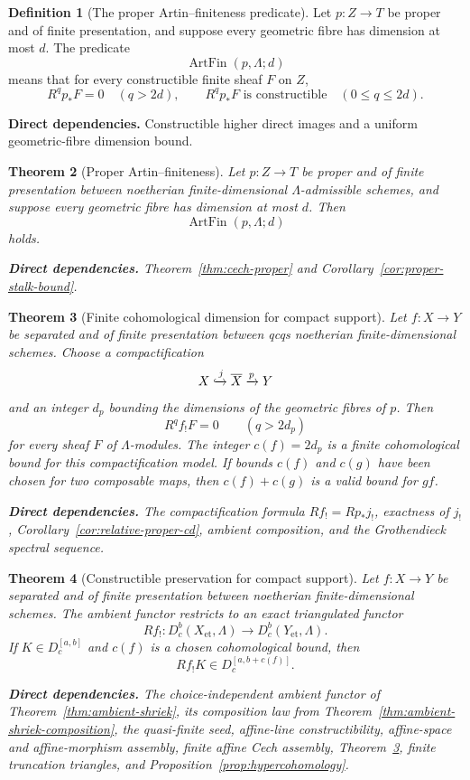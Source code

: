 \documentclass[10pt]{article}
\newtheorem{theorem}{Theorem}[section]
\theoremstyle{definition}
\newtheorem{definition}[theorem]{Definition}
\newcommand{\Dbc}{D^b_c}
\newcommand{\deps}[1]{\par\smallskip\noindent\textbf{Direct dependencies.} #1}
\begin{document}
\begin{definition}[The proper Artin--finiteness predicate]
Let $p:Z\to T$ be proper and of finite presentation, and suppose every
geometric fibre has dimension at most $d$.  The predicate
\[
 \operatorname{ArtFin}(p,\Lambda;d)
\]
means that for every constructible finite sheaf $F$ on $Z$,
\[
 R^qp_*F=0\quad(q>2d),
 \qquad
 R^qp_*F\text{ is constructible}\quad(0\leq q\leq2d).
\]
\deps{Constructible higher direct images and a uniform geometric-fibre
dimension bound.}
\end{definition}

\begin{theorem}[Proper Artin--finiteness]
\label{thm:artfin}
Let $p:Z\to T$ be proper and of finite presentation between noetherian
finite-dimensional $\Lambda$-admissible schemes, and suppose every geometric
fibre has dimension at most $d$.  Then
\[
 \operatorname{ArtFin}(p,\Lambda;d)
\]
holds.
\deps{Theorem~\ref{thm:cech-proper} and
Corollary~\ref{cor:proper-stalk-bound}.}
\end{theorem}

\begin{theorem}[Finite cohomological dimension for compact support]
\label{thm:finite-cd-shriek}
Let $f:X\to Y$ be separated and of finite presentation between qcqs
noetherian finite-dimensional schemes.  Choose a compactification
\[
 X\xhookrightarrow{j}\overline X\xrightarrow{p}Y
\]
and an integer $d_p$ bounding the dimensions of the geometric fibres of
$p$.  Then
\[
 R^qf_!F=0\qquad(q>2d_p)
\]
for every sheaf $F$ of $\Lambda$-modules.  The integer $c(f)=2d_p$ is a finite
cohomological bound for this compactification model.  If bounds $c(f)$ and
$c(g)$ have been chosen for two composable maps, then $c(f)+c(g)$ is a valid
bound for $gf$.
\deps{The compactification formula $Rf_!=Rp_*j_!$, exactness of $j_!$,
Corollary~\ref{cor:relative-proper-cd}, ambient composition, and the
Grothendieck spectral sequence.}
\end{theorem}

\begin{theorem}[Constructible preservation for compact support]
\label{thm:shriek-preserves}
Let $f:X\to Y$ be separated and of finite presentation between noetherian
finite-dimensional schemes.  The ambient functor restricts to an exact
triangulated functor
\[
 Rf_!:\Dbc(X_{\mathrm{et}},\Lambda)\longrightarrow
       \Dbc(Y_{\mathrm{et}},\Lambda).
\]
If $K\in D_c^{[a,b]}$ and $c(f)$ is a chosen cohomological bound, then
\[
 Rf_!K\in D_c^{[a,b+c(f)]}.
\]
\deps{The choice-independent ambient functor of
Theorem~\ref{thm:ambient-shriek}, its composition law from
Theorem~\ref{thm:ambient-shriek-composition}, the quasi-finite seed,
affine-line constructibility, affine-space and affine-morphism assembly,
finite affine Cech assembly, Theorem~\ref{thm:finite-cd-shriek}, finite
truncation triangles, and Proposition~\ref{prop:hypercohomology}.}
\end{theorem}
\end{document}
